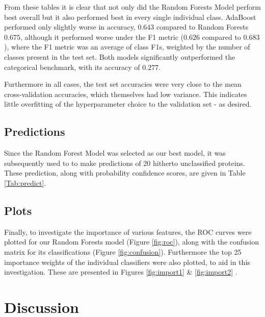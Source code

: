 \documentclass{bioinfo}
\begin{document}
From these tables it is clear that not only did the Random Forests Model perform best overall but it also performed best in every single individual class. AdaBoost performed only slightly worse in accuracy, $0.643$ compared to Random Forests $0.675$, although it performed worse under the F1 metric ($0.626$ compared to $0.683$), where the F1 metric was an average of class F1s, weighted by the number of classes present in the test set. Both models significantly outperformed the categorical benchmark, with its accuracy of $0.277$.

Furthermore in all cases, the test set accuracies were very close to the mean cross-validation accuracies, which themselves had low variance. This indicates little overfitting of the hyperparameter choice to the validation set - as desired.

\subsection{Predictions}

Since the Random Forest Model was selected as our best model, it was subsequently used to to make predictions of 20 hitherto unclassified proteins. These prediction, along with probability confidence scores, are given in Table \ref{Tab:predict}.



\subsection{Plots}

Finally, to investigate the importance of various features, the ROC curves were plotted for our Random Forests model  (Figure \ref{fig:roc}), along with the confusion matrix for its classifications (Figure \ref{fig:confusion}). 
Furthermore the top 25 importance weights of the individual classifiers were also plotted, to aid in this investigation. 
These are presented in Figures \ref{fig:import1} \&  \ref{fig:import2} .



\section{Discussion}
\end{document}
